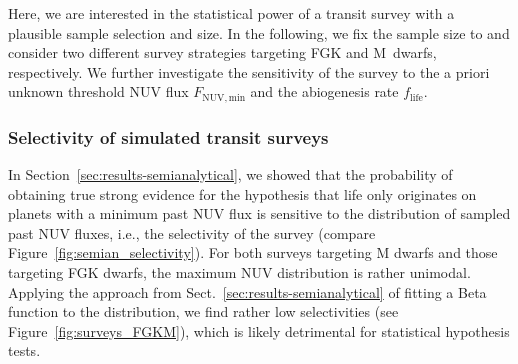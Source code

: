 \documentclass[twocolumn,twocolappendix,linenumbers]{aastex631}
\begin{document}
Here, we are interested in the statistical power of a transit survey with a plausible sample selection and size.
In the following, we fix the sample size to  and consider two different survey strategies targeting FGK and M~dwarfs, respectively.
We further investigate the sensitivity of the survey to the a priori unknown threshold \gls{NUV} flux $F_\mathrm{NUV, min}$ and the abiogenesis rate $f_\mathrm{life}$.

\subsubsection{Selectivity of simulated transit surveys}
In Section~\ref{sec:results-semianalytical}, we showed that the probability of obtaining true strong evidence for the hypothesis that life only originates on planets with a minimum past \gls{NUV} flux is sensitive to the distribution of sampled past \gls{NUV} fluxes, i.e., the selectivity of the survey (compare Figure~\ref{fig:semian_selectivity}).
For both surveys targeting M dwarfs and those targeting FGK dwarfs, the maximum \gls{NUV} distribution is rather unimodal.
Applying the approach from Sect.~\ref{sec:results-semianalytical} of fitting a Beta function to the distribution, we find rather low selectivities (see Figure~\ref{fig:surveys_FGKM}), which is likely detrimental for statistical hypothesis tests.

\end{document}
